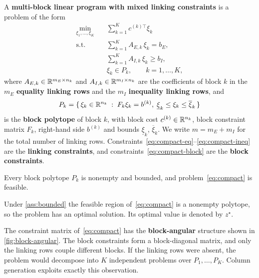 \begin{definition} \label{def:multiblock}
A \textbf{multi-block linear program with mixed linking constraints} is a problem of the
form
\begin{subequations} \label{eq:compact}
\begin{align}
\min_{\xi_1,\dots,\xi_K} \quad & \sum_{k=1}^{K} c^{(k)\top} \xi_k \\
\text{s.t.} \quad
& \sum_{k=1}^{K} A_{E,k}\, \xi_k = b_E, \label{eq:compact-eq} \\
& \sum_{k=1}^{K} A_{I,k}\, \xi_k \ge b_I, \label{eq:compact-ineq} \\
& \xi_k \in P_k, \qquad k = 1,\dots,K, \label{eq:compact-block}
\end{align}
\end{subequations}
where $A_{E,k} \in \mathbb{R}^{m_E\times n_k}$ and $A_{I,k}\in\mathbb{R}^{m_I\times n_k}$ are the
coefficients of block $k$ in the $m_E$ \textbf{equality linking rows} and the $m_I$
\textbf{inequality linking rows}, and
\[
P_k = \{\, \xi_k \in \mathbb{R}^{n_k} \;:\; F_k \xi_k = b^{(k)},\; \underline{\xi}_k \le \xi_k \le \overline{\xi}_k \,\}
\]
is the \textbf{block polytope} of block $k$, with block cost $c^{(k)}\in\mathbb{R}^{n_k}$, block constraint matrix $F_k$, right-hand side $b^{(k)}$ and bounds $\underline{\xi}_k$, $\overline{\xi}_k$. We write $m = m_E + m_I$ for the total number of
linking rows. Constraints~\eqref{eq:compact-eq}--\eqref{eq:compact-ineq} are the
\textbf{linking constraints}, and constraints~\eqref{eq:compact-block} are the
\textbf{block constraints}.
\end{definition}

\begin{assumption} \label{ass:bounded}
Every block polytope $P_k$ is nonempty and bounded, and problem~\eqref{eq:compact} is
feasible.
\end{assumption}

Under \cref{ass:bounded} the feasible region of~\eqref{eq:compact} is a nonempty polytope,
so the problem has an optimal solution. Its optimal value is denoted by $z^\star$.

\bigskip

The constraint matrix of~\eqref{eq:compact} has the \textbf{block-angular} structure shown
in \cref{fig:block-angular}. The block constraints form a block-diagonal matrix, and only
the linking rows couple different blocks. If the linking rows were absent, the problem would
decompose into $K$ independent problems over $P_1, \dots, P_K$. Column generation exploits
exactly this observation.

